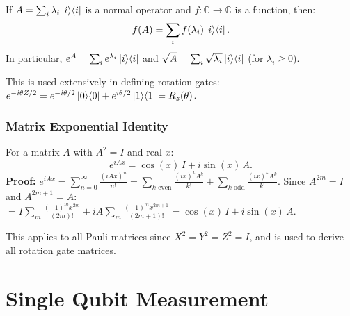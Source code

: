\documentclass[10pt,a4paper]{article}
\begin{document}
\begin{tcolorbox}[defstyle, title={Definition: Function of a Normal Operator}]
If $A=\sum_i\lambda_i\ket{i}\!\bra{i}$ is a normal operator and $f:\mathbb{C}\to\mathbb{C}$ is a function, then:
\[
f(A)=\sum_i f(\lambda_i)\ket{i}\!\bra{i}.
\]
In particular, $e^A=\sum_i e^{\lambda_i}\ket{i}\!\bra{i}$ and $\sqrt{A}=\sum_i\sqrt{\lambda_i}\ket{i}\!\bra{i}$ (for $\lambda_i\ge 0$).
\end{tcolorbox}

This is used extensively in defining rotation gates: $e^{-i\theta Z/2}=e^{-i\theta/2}\ket{0}\!\bra{0}+e^{i\theta/2}\ket{1}\!\bra{1}=R_z(\theta)$.

\subsubsection*{Matrix Exponential Identity}

\begin{tcolorbox}[propstyle, title={Proposition: Matrix Exponential for $A^2=I$}]
For a matrix $A$ with $A^2=I$ and real $x$:
\[
e^{iAx}=\cos(x)\,I+i\sin(x)\,A.
\]
\textbf{Proof:} $e^{iAx}=\sum_{n=0}^\infty\frac{(iAx)^n}{n!}=\sum_{k\text{ even}}\frac{(ix)^k A^k}{k!}+\sum_{k\text{ odd}}\frac{(ix)^k A^k}{k!}$. Since $A^{2m}=I$ and $A^{2m+1}=A$:
$=I\sum_{m}\frac{(-1)^m x^{2m}}{(2m)!}+iA\sum_{m}\frac{(-1)^m x^{2m+1}}{(2m+1)!}=\cos(x)\,I+i\sin(x)\,A$.
\end{tcolorbox}

This applies to all Pauli matrices since $X^2=Y^2=Z^2=I$, and is used to derive all rotation gate matrices.

\newpage
\section{Single Qubit Measurement}
\end{document}
